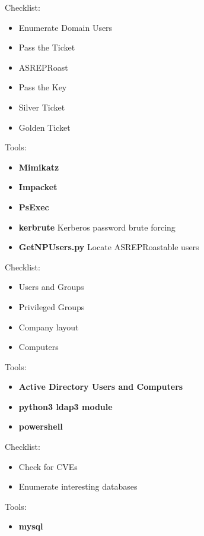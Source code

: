 \documentclass[a4paper,10pt]{article}
\begin{document}
\begin{multicols}{2}
\begin{tcolorbox}[breakable, title=KERBEROS]
Checklist:
\begin{itemize}
	\itemsep0em
	\item Enumerate Domain Users
	\item Pass the Ticket
	\item ASREPRoast
	\item Pass the Key
	\item Silver Ticket
	\item Golden Ticket
\end{itemize}
Tools:
\begin{itemize}
	\itemsep0em
	\item \textbf{Mimikatz}
	\item \textbf{Impacket}
	\item \textbf{PsExec}
	\item \textbf{kerbrute} Kerberos password brute forcing
	\item \textbf{GetNPUsers.py} Locate ASREPRoastable users
\end{itemize}
\end{tcolorbox}
\begin{tcolorbox}[breakable, title=LDAP]
Checklist:
\begin{itemize}
	\itemsep0em
	\item Users and Groups
	\item Privileged Groups
	\item Company layout
	\item Computers
\end{itemize}
Tools:
\begin{itemize}
	\itemsep0em
	\item \textbf{Active Directory Users and Computers}
	\item \textbf{python3 ldap3 module}
	\item \textbf{powershell}
\end{itemize}
\end{tcolorbox}
\begin{tcolorbox}[breakable, title=MYSQL/MariaDB]
Checklist:
\begin{itemize}
	\itemsep0em
	\item Check for CVEs
	\item Enumerate interesting databases
\end{itemize}
Tools:
\begin{itemize}
	\itemsep0em
	\item \textbf{mysql}
\end{itemize}

\end{tcolorbox}
\end{multicols}
\end{document}
